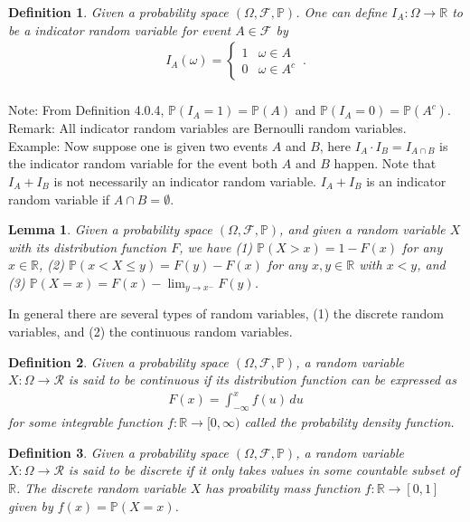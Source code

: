 \documentclass[11pt, onesided]{book}
\theoremstyle{break}
\theoremstyle{break}
\newtheorem{lem}{Lemma}[thm]
\newtheorem{defn}{Definition}[thm]
\newcommand{\R}{\mathbb{R}}
\newcommand{\note}{\color{red}Note: \color{black}}
\newcommand{\remark}{\color{blue}Remark: \color{black}}
\newcommand{\example}{\color{green}Example: \color{black}}
\begin{document}
\begin{defn}
Given a probability space $(\Omega, \mathcal{F}, \mathbb{P})$. One can define $I_A:\Omega \to \R$ to be a indicator random variable for event $A \in \mathcal{F}$ by
\begin{align*}
I_A(\omega) = \begin{cases}
1 & \omega \in A\\
0 & \omega \in A^c
\end{cases}\, .\\
\end{align*}
\end{defn}

\note From Definition 4.0.4, $\mathbb{P}(I_A=1) = \mathbb{P}(A)$ and $\mathbb{P}(I_A = 0) = \mathbb{P}(A^c)$. \\
\remark All indicator random variables are Bernoulli random variables. \\

\example Now suppose one is given two events $A$ and $B$, here $I_{A} \cdot I_B = I_{A\cap B}$ is the indicator random variable for the event both $A$ and $B$ happen. Note that $I_A + I_B$ is not necessarily an indicator random variable. $I_A + I_B$ is an indicator random variable if $A\cap B = \emptyset$. 

\begin{lem}
Given a probability space $(\Omega, \mathcal{F}, \mathbb{P})$, and given a random variable $X$ with its distribution function $F$, we have (1) $\mathbb{P}(X>x) = 1-F(x)$ for any $x \in \R$, (2) $\mathbb{P}(x<X\leq y) = F(y) - F(x)$ for any $x,y \in \R$ with $x<y$, and (3) $\mathbb{P}(X=x) = F(x) -\lim_{y\to x^-} F(y)$. 
\end{lem}


In general there are several types of random variables, (1) the discrete random variables, and (2) the continuous random variables.\\


\begin{defn}
Given a probability space $(\Omega, \mathcal{F}, \mathbb{P})$, a random variable $X:\Omega \to \mathcal{R}$ is said to be continuous if its distribution function can be expressed as 
\begin{align*}
F(x) = \int_{-\infty}^x f(u) \, du
\end{align*}
for some integrable function $f:\R \to [0,\infty)$ called the probability density function.
\end{defn}

\begin{defn}
Given a probability space $(\Omega, \mathcal{F}, \mathbb{P})$, a random variable $X:\Omega \to \mathcal{R}$ is said to be discrete if it only takes values in some countable subset of $\R$. The discrete random variable $X$ has proability mass function $f:\R \to [0,1]$ given by $f(x) = \mathbb{P}(X = x)$. 
\end{defn}
\end{document}
